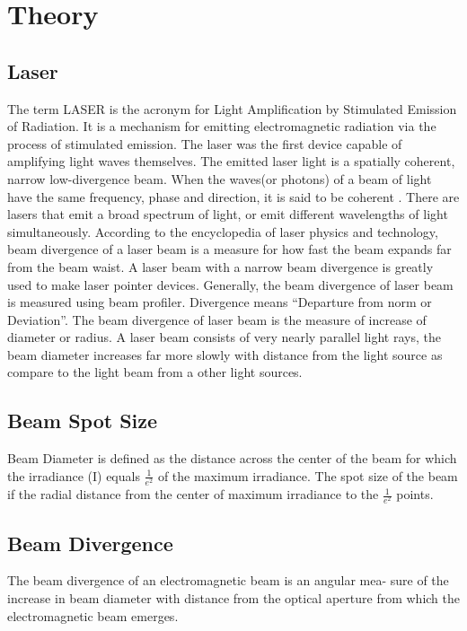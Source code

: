 \documentclass[
	letterpaper, %
	10pt, %
]{CSUniSchoolLabReport}
\begin{document}
\section{Theory}
\subsection{Laser}
The term LASER is the acronym for Light Amplification by Stimulated Emission of
Radiation. It is a mechanism for emitting electromagnetic radiation via the process of stimulated
emission. The laser was the first device capable of amplifying light waves themselves. The emitted
laser light is a spatially coherent, narrow low-divergence beam. When the waves(or photons) of a
beam of light have the same frequency, phase and direction, it is said to be coherent . There are
lasers that emit a broad spectrum of light, or emit different wavelengths of light
simultaneously. According to the encyclopedia  of laser physics and technology, beam divergence
of a laser beam is a measure for how fast the beam expands far from the beam waist. A laser beam
with a narrow beam divergence is greatly used to make laser pointer devices. Generally, the beam
divergence of laser beam is measured using beam profiler.
Divergence means “Departure from norm or Deviation”. The beam divergence of laser
beam is the measure of increase of diameter or radius. A laser beam consists of very nearly
parallel light rays, the beam diameter increases far more slowly with distance from the light
source as compare to the light beam from a other light sources.
\subsection{Beam Spot Size}
Beam Diameter is defined as the distance across the center of the beam for which
the irradiance (I) equals \(\frac{1}{e^2}\) of the maximum irradiance. The spot size of the beam if the radial
distance from the center of maximum irradiance to the \(\frac{1}{e^2}\)  points.
\subsection{Beam Divergence} 
The beam divergence of an electromagnetic beam is an angular mea- sure of the
increase in beam diameter with distance from the optical aperture from which the electromagnetic
beam emerges. 
\end{document}

